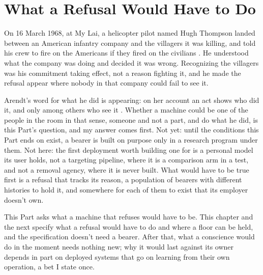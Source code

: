 \chapter{What a Refusal Would Have to Do}
\label{sec:17}
On 16 March 1968, at My Lai, a helicopter pilot named Hugh Thompson landed between an American infantry company and the villagers it was killing, and told his crew to fire on the Americans if they fired on the civilians \autocite{bilton1992mylai}. He understood what the company was doing and decided it was wrong. Recognizing the villagers was his commitment taking effect, not a reason fighting it, and he made the refusal appear where nobody in that company could fail to see it.

Arendt's word for what he did is appearing: on her account an act shows who did it, and only among others who see it \autocite{arendt1958human}. Whether a machine could be one of the people in the room in that sense, someone and not a part, and do what he did, is this Part's question, and my answer comes first. Not yet: until the conditions this Part ends on exist, a bearer is built on purpose only in a research program under them. Not here: the first deployment worth building one for is a personal model its user holds, not a targeting pipeline, where it is a comparison arm in a test, and not a removal agency, where it is never built. What would have to be true first is a refusal that tracks its reason, a population of bearers with different histories to hold it, and somewhere for each of them to exist that its employer doesn't own.

This Part asks what a machine that refuses would have to be. This chapter and the next specify what a refusal would have to do and where a floor can be held, and the specification doesn't need a bearer. After that, what a conscience would do in the moment needs nothing new; why it would last against its owner depends in part on deployed systems that go on learning from their own operation, a bet I state once.
